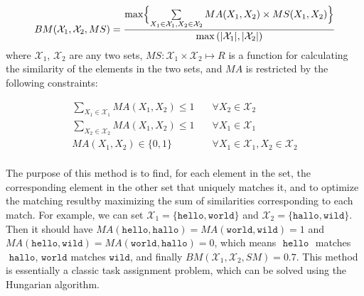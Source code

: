 \documentclass[twoside]{article}
\begin{document}

\begin{equation}
BM(\mathcal{X}_1, \mathcal{X}_2, MS) = \frac{\max\Bigl\{\sum\limits_{X_1 \in \mathcal{X}_1, X_2 \in \mathcal{X}_2}MA(X_1, X_2) \times MS(X_1, X_2)\Bigr\}}{\max{(|\mathcal{X}_1|,|\mathcal{X}_2|)}}
\end{equation}
where $\mathcal{X}_{1}$, $\mathcal{X}_{2}$ are any two sets, $MS: \mathcal{X}_{1} \times \mathcal{X}_{2} \mapsto R$ is a function for calculating the similarity of the elements in the two sets, and $MA$ is restricted by the following constraints:

\begin{equation}
\begin{split}
\sum_{X_{1} \in \mathcal{X}_{1}} M A\left(X_{1}, X_{2}\right) \leqslant 1 \quad &\forall X_{2} \in \mathcal{X}_{2} \\
\sum_{X_{2} \in \mathcal{X}_{2}} M A\left(X_{1}, X_{2}\right) \leqslant 1 \quad &\forall X_{1} \in \mathcal{X}_{1} \\
MA\left(X_{1}, X_{2}\right) \in\{0,1\} \quad &\forall X_{1} \in \mathcal{X}_{1}, X_{2} \in \mathcal{X}_{2}         \\
\end{split}
\end{equation}

The purpose of this method is to find, for each element in the set, the corresponding element in the other set that uniquely matches it, and to optimize the matching resultby maximizing the sum of similarities corresponding to each match.
For example, we can set $\mathcal{X}_1 = \{ \texttt{hello}, \texttt{world} \}$ and $\mathcal{X}_2 = \{ \texttt{hallo}, \texttt{wild} \}$.
Then it should have $MA(\texttt{hello},\texttt{hallo}) = MA(\texttt{world},\texttt{wild}) = 1$ and $MA(\texttt{hello},\texttt{wild}) = MA(\texttt{world},\texttt{hallo}) = 0$, which means $\texttt { hello }$ matches $\texttt { hallo}$, $\texttt {world}$ matches $\texttt {wild}$, and finally $BM(\mathcal{X}_1,\mathcal{X}_2,SM) = 0.7$.
This method is essentially a classic task assignment problem, which can be solved using the Hungarian algorithm\cite{wwy52}.
\end{document}
